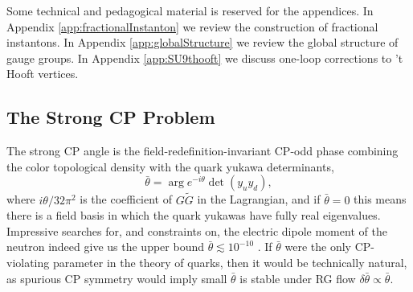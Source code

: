 \documentclass[11pt,a4paper]{article}
\begin{document}
Some technical and pedagogical material is reserved for the appendices. In Appendix \ref{app:fractionalInstanton} we review the construction of fractional instantons. In Appendix \ref{app:globalStructure} we review the global structure of gauge groups. In Appendix \ref{app:SU9thooft} we discuss one-loop corrections to 't Hooft vertices. 

\subsection{The Strong CP Problem}

The strong CP angle is the field-redefinition-invariant CP-odd phase combining the color topological density with the quark yukawa determinants,
\begin{equation} \label{eqn:bartheta}
    \bar \theta = \arg e^{-i\theta} \det\left(y_u y_d\right), 
\end{equation}
where $i \theta/32\pi^2$ is the coefficient of $G\tilde{G}$ in the Lagrangian, and if $\bar \theta = 0$ this means there is a field basis in which the quark yukawas have fully real eigenvalues. 
Impressive searches for, and constraints on, the electric dipole moment of the neutron indeed give us the upper bound  $\bar \theta \lesssim 10^{-10}$ \cite{Dar:2000tn,Abel:2020pzs}. 
If $\bar \theta$ were the only CP-violating parameter in the theory of quarks, then it would be technically natural, as spurious CP symmetry would imply small $\bar \theta$ is stable under RG flow $\delta \bar \theta \propto \bar \theta$. 
\end{document}
